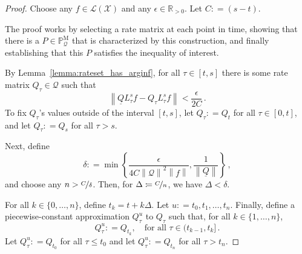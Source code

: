 \documentclass[10pt]{paper}
\theoremstyle{definition}
\newcommand{\reals}{\mathbb{R}}
\newcommand{\realspos}{\reals_{>0}}
\newcommand{\states}{\mathcal{X}}
\newcommand{\processes}{\mathbb{P}}
\newcommand{\mprocesses}{\processes^{\mathrm{M}}}
\newcommand{\lbound}{L}
\newcommand{\gambles}{\mathcal{L}}
\newcommand{\gamblesX}{\gambles(\states)}
\newcommand{\rateset}{\mathcal{Q}}
\newcommand{\lrate}{\underline{Q}}
\newcommand{\norm}[1]{\left\lVert #1 \right\rVert}
\newcommand{\coloneqq}{:\!=}
\newcommand{\argmin}{\arg\min}
\begin{document}
\begin{proof}
Choose any $f\in\gamblesX$ and any $\epsilon\in\realspos$. Let $C\coloneqq (s-t)$. 

The proof works by selecting a rate matrix at each point in time, showing that there is a $P\in\mprocesses_\rateset$ that is characterized by this construction, and finally establishing that this $P$ satisfies the inequality of interest.

By Lemma~\ref{lemma:rateset_has_arginf}, for all $\tau\in[t,s]$ there is some rate matrix $Q_\tau\in\rateset$ such that
\begin{equation}\label{eq:lower_char_rate_matrix}
\norm{\lrate \lbound_\tau^sf - Q_\tau \lbound_\tau^sf} < \frac{\epsilon}{2C}\,.
\end{equation}
To fix $Q_\tau$'s values outside of the interval $[t,s]$, let $Q_\tau \coloneqq Q_t$ for all $\tau\in[0,t]$, and let $Q_\tau\coloneqq Q_s$ for all $\tau>s$.

Next, define
\begin{equation}\label{eq:delta_required_for_tight_bound}
\delta \coloneqq \min\left\{\frac{\epsilon}{4C\norm{\mathcal{Q}}^2\norm{f}},\frac{1}{\norm{\lrate}}\right\}\,,
\end{equation}
and choose any $n>\nicefrac{C}{\delta}$. Then, for $\Delta\coloneqq \nicefrac{C}{n}$, we have $\Delta<\delta$.

For all $k\in\{0,\ldots,n\}$, define $t_k=t+k\Delta$. Let $u\coloneqq t_0,t_1,\ldots,t_n$. Finally, define a piecewise-constant approximation $Q_\tau^u$ to $Q_\tau$ such that, for all $k\in\{1,\ldots,n\}$,
\begin{equation}\label{eq:lower_char_matrix_linear_approx}
Q_\tau^u \coloneqq Q_{t_k},\quad\text{for all $\tau\in (t_{k-1},t_k]$}\,.
\end{equation}
Let $Q_\tau^u\coloneqq Q_{t_0}$ for all $\tau\leq t_0$ and let $Q_\tau^u\coloneqq Q_{t_n}$ for all $\tau>t_n$.


\end{proof}
\end{document}

